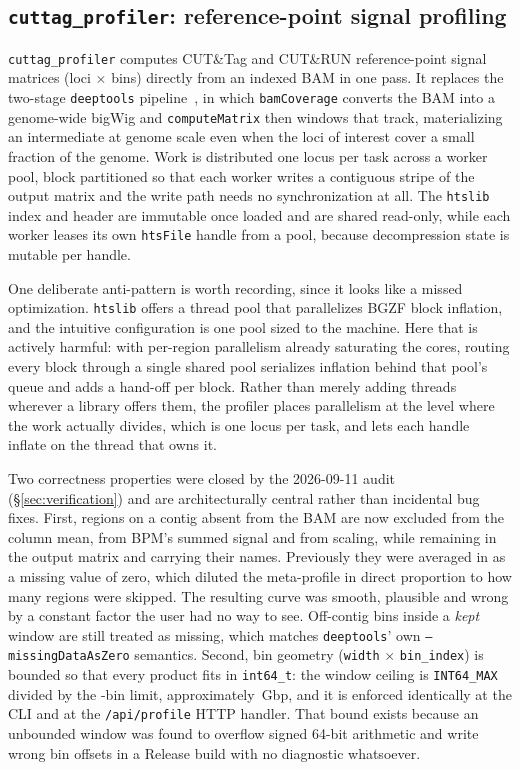 \documentclass[10pt,twocolumn]{article}
\begin{document}
\subsection{\texttt{cuttag\_profiler}: reference-point signal profiling}
\label{sec:cuttag}

\texttt{cuttag\_profiler} computes CUT\&Tag and CUT\&RUN
\citep{kayaokur2019cuttag} reference-point signal matrices (loci $\times$
bins) directly from an indexed BAM in one pass. It replaces the two-stage
\texttt{deeptools} pipeline~\citep{ramirez2016deeptools}, in which
\texttt{bamCoverage} converts the BAM into a genome-wide bigWig and
\texttt{computeMatrix} then windows that track, materializing an intermediate
at genome scale even when the loci of interest cover a small fraction of the
genome. Work is distributed one locus per task across a worker pool, block
partitioned so that each worker writes a contiguous stripe of the output
matrix and the write path needs no synchronization at all. The
\texttt{htslib}~\citep{danecek2021htslib} index and header are immutable once
loaded and are shared read-only, while each worker leases its own
\texttt{htsFile} handle from a pool, because decompression state is mutable
per handle.

One deliberate anti-pattern is worth recording, since it looks like a missed
optimization. \texttt{htslib} offers a thread pool that parallelizes BGZF
block inflation, and the intuitive configuration is one pool sized to the
machine. Here that is actively harmful: with per-region parallelism already
saturating the cores, routing every block through a single shared pool
serializes inflation behind that pool's queue and adds a hand-off per block.
Rather than merely adding threads wherever a library offers them, the
profiler places parallelism at the level where the work actually divides,
which is one locus per task, and lets each handle inflate on the thread that
owns it.

Two correctness properties were closed by the 2026-09-11 audit
(\S\ref{sec:verification}) and are architecturally central rather than
incidental bug fixes. First, regions on a contig absent from the BAM are now
excluded from the column mean, from BPM's summed signal and from scaling,
while remaining in the output matrix and carrying their names. Previously
they were averaged in as a missing value of zero, which diluted the
meta-profile in direct proportion to how many regions were skipped. The
resulting curve was smooth, plausible and wrong by a constant factor the user
had no way to see. Off-contig bins inside a \emph{kept} window are still
treated as missing, which matches \texttt{deeptools}' own
\texttt{--missingDataAsZero} semantics. Second, bin geometry
(\texttt{width} $\times$ \texttt{bin\_index}) is bounded so that every product
fits in \texttt{int64\_t}: the window ceiling is \texttt{INT64\_MAX} divided
by the \CuttagMaxBins{}-bin limit, approximately
\CuttagMaxWindowBp{}\,Gbp, and it is enforced identically at the CLI and at
the \texttt{/api/profile} HTTP handler. That bound exists because an
unbounded window was found to overflow signed 64-bit arithmetic and write
wrong bin offsets in a Release build with no diagnostic whatsoever.
\end{document}
